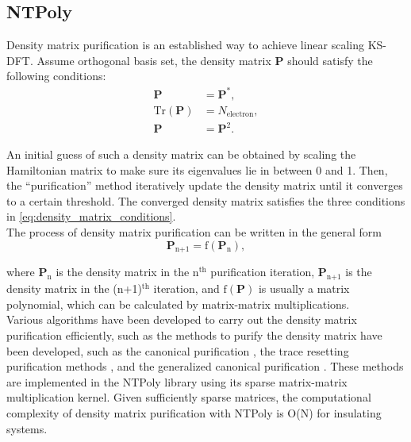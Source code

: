 \documentclass{report}
\begin{document}
\subsection{NTPoly}
\label{subsec:solvers_ntpoly}
Density matrix purification is an established way to achieve linear scaling KS-DFT.  Assume orthogonal basis set, the density matrix $\boldsymbol{P}$ should satisfy the following conditions:
\begin{equation}
\label{eq:density_matrix_conditions}
\begin{split}
\boldsymbol{P} & = \boldsymbol{P}^* ,\\
\text{Tr}(\boldsymbol{P}) & = N_\text{electron} ,\\
\boldsymbol{P} & = \boldsymbol{P}^2 .
\end{split}
\end{equation}

An initial guess of such a density matrix can be obtained by scaling the Hamiltonian matrix to make sure its eigenvalues lie in between 0 and 1.  Then, the ``purification'' method iteratively update the density matrix until it converges to a certain threshold.  The converged density matrix satisfies the three conditions in \ref{eq:density_matrix_conditions}.\\

The process of density matrix purification can be written in the general form
\begin{equation}
\label{eq:purification}
\boldsymbol{P}_\text{n+1} = \text{f}(\boldsymbol{P}_\text{n}) ,
\end{equation}

where $\boldsymbol{P}_\text{n}$ is the density matrix in the n$^\text{th}$ purification iteration, $\boldsymbol{P}_\text{n+1}$ is the density matrix in the (n+1)$^\text{th}$ iteration, and $\text{f}(\boldsymbol{P})$ is usually a matrix polynomial, which can be calculated by matrix-matrix multiplications.\\

Various algorithms have been developed to carry out the density matrix purification efficiently, such as the methods to purify the density matrix have been developed, such as the canonical purification \cite{purification_palser_1998}, the trace resetting purification methods \cite{purification_niklasson_2002}, and the generalized canonical purification \cite{purification_truflandier_2016}.  These methods are implemented in the NTPoly library \cite{ntpoly_dawson_2018} using its sparse matrix-matrix multiplication kernel.  Given sufficiently sparse matrices, the computational complexity of density matrix purification with NTPoly is O(N) for insulating systems.\\
\end{document}
